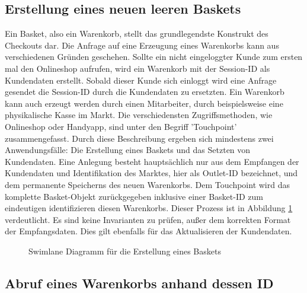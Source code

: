 \subsection{Erstellung eines neuen leeren Baskets}

Ein Basket, also ein Warenkorb, stellt das grundlegendste Konstrukt des Checkouts dar. Die Anfrage auf eine Erzeugung eines Warenkorbs kann aus verschiedenen Gründen geschehen. Sollte ein nicht eingeloggter Kunde zum ersten mal den Onlineshop aufrufen, wird ein Warenkorb mit der Session-ID als Kundendaten erstellt. Sobald dieser Kunde sich einloggt wird eine Anfrage gesendet die Session-ID durch die Kundendaten zu ersetzten. Ein Warenkorb kann auch erzeugt werden durch einen Mitarbeiter, durch beispielsweise eine physikalische Kasse im Markt. Die verschiedensten Zugriffsmethoden, wie Onlineshop oder Handyapp, sind unter den Begriff 'Touchpoint' zusammengefasst. Durch diese Beschreibung ergeben sich mindestens zwei Anwendungsfälle: Die Erstellung eines Baskets und das Setzten von Kundendaten. Eine Anlegung besteht hauptsächlich nur aus dem Empfangen der Kundendaten und Identifikation des Marktes, hier als Outlet-ID bezeichnet, und dem permanente Speicherns des neuen Warenkorbs. Dem Touchpoint wird das komplette Basket-Objekt zurückgegeben inklusive einer Basket-ID zum eindeutigen identifizieren diesen Warenkorbs. Dieser Prozess ist in Abbildung \ref{fig:SL-Basketcreation} verdeutlicht. Es sind keine Invarianten zu prüfen, außer dem korrekten Format der Empfangsdaten. Dies gilt ebenfalls für das Aktualisieren der Kundendaten.

\begin{figure}[htbp]
	\centering
	
	\caption{Swimlane Diagramm für die Erstellung eines Baskets}
	\label{fig:SL-Basketcreation}
\end{figure}

\subsection{Abruf eines Warenkorbs anhand dessen ID}

